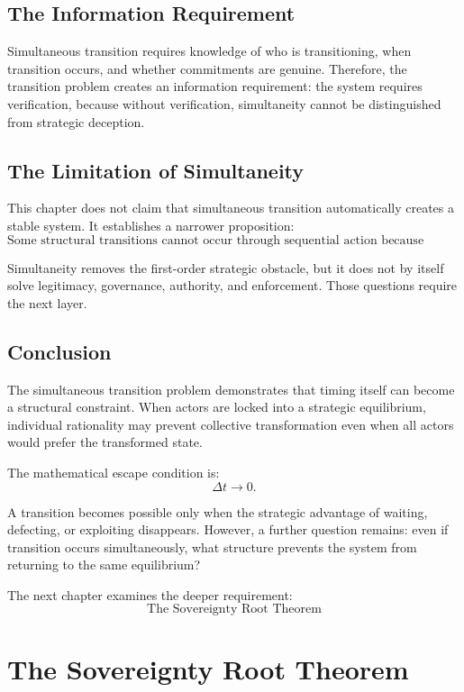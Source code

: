 \documentclass[11pt,openany]{book}
\theoremstyle{plain}
\theoremstyle{definition}
\begin{document}
\section*{The Information Requirement}

Simultaneous transition requires knowledge of who is transitioning, when transition occurs, and whether commitments are genuine. Therefore, the transition problem creates an information requirement: the system requires verification, because without verification, simultaneity cannot be distinguished from strategic deception.

\section*{The Limitation of Simultaneity}

This chapter does not claim that simultaneous transition automatically creates a stable system. It establishes a narrower proposition:
\[
\boxed{
\text{Some structural transitions cannot occur through sequential action because sequential action creates exploitable asymmetry.}
}
\]

Simultaneity removes the first-order strategic obstacle, but it does not by itself solve legitimacy, governance, authority, and enforcement. Those questions require the next layer.

\section*{Conclusion}

The simultaneous transition problem demonstrates that timing itself can become a structural constraint. When actors are locked into a strategic equilibrium, individual rationality may prevent collective transformation even when all actors would prefer the transformed state. 

The mathematical escape condition is:
\[
\boxed{
\Delta t \to 0.
}
\]

A transition becomes possible only when the strategic advantage of waiting, defecting, or exploiting disappears. However, a further question remains: even if transition occurs simultaneously, what structure prevents the system from returning to the same equilibrium? 

The next chapter examines the deeper requirement:
\[
\boxed{
\text{The Sovereignty Root Theorem}
}
\]

\chapter{The Sovereignty Root Theorem}
\end{document}
